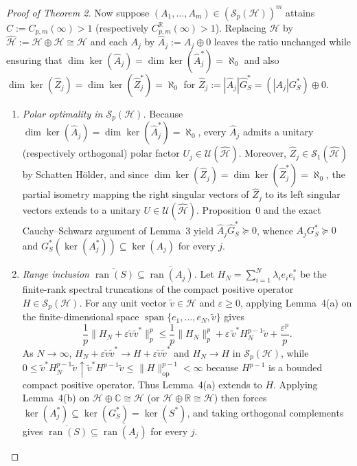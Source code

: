 \documentclass[10pt,letterpaper]{article}
\newcommand{\C}{\mathbb{C}}
\newcommand{\R}{\mathbb{R}}
\newcommand{\Hilb}{\mathcal{H}}
\newcommand{\Sp}{\mathcal{S}_p}
\newcommand{\ran}{\operatorname{ran}}
\newcommand{\op}{\mathrm{op}}
\begin{document}
\begin{proof}[Proof of Theorem 2]
Now suppose $(A_1,\dots,A_m) \in (\Sp(\Hilb))^m$ attains $C := C_{p,m}(\infty) > 1$ (respectively $C_{p,m}^{\R}(\infty) > 1$). Replacing $\Hilb$ by $\widehat{\Hilb} := \Hilb \oplus \Hilb \cong \Hilb$ and each $A_j$ by $\widehat{A}_j := A_j \oplus 0$ leaves the ratio unchanged while ensuring that $\dim\ker(\widehat{A}_j) = \dim\ker(\widehat{A}_j^*) = \aleph_0$ and also $\dim\ker(\widehat{Z}_j) = \dim\ker(\widehat{Z}_j^*) = \aleph_0$ for $\widehat{Z}_j := |\widehat{A}_j|\widehat{G}_S^* = (|A_j|G_S^*) \oplus 0$.
\begin{enumerate}[leftmargin=1.6em,itemsep=2.5pt]
  \item \emph{Polar optimality in $\Sp(\Hilb)$.} Because $\dim\ker(\widehat{A}_j) = \dim\ker(\widehat{A}_j^*) = \aleph_0$, every $\widehat{A}_j$ admits a unitary (respectively orthogonal) polar factor $U_j \in \mathcal{U}(\widehat{\Hilb})$. Moreover, $\widehat{Z}_j \in \mathcal{S}_1(\widehat{\Hilb})$ by Schatten H\"older, and since $\dim\ker(\widehat{Z}_j) = \dim\ker(\widehat{Z}_j^*) = \aleph_0$, the partial isometry mapping the right singular vectors of $\widehat{Z}_j$ to its left singular vectors extends to a unitary $U \in \mathcal{U}(\widehat{\Hilb})$. Proposition~0 and the exact Cauchy--Schwarz argument of Lemma~3 yield $\widehat{A}_j \widehat{G}_S^* \succeq 0$, whence $A_j G_S^* \succeq 0$ and $G_S^*(\ker(A_j^*)) \subseteq \ker(A_j)$ for every $j$.
  \item \emph{Range inclusion $\overline{\ran(S)} \subseteq \overline{\ran(A_j)}$.} Let $H_N = \sum_{i=1}^N \lambda_i e_i e_i^*$ be the finite-rank spectral truncations of the compact positive operator $H \in \Sp(\Hilb)$. For any unit vector $\tilde{v} \in \Hilb$ and $\varepsilon \ge 0$, applying Lemma~4(a) on the finite-dimensional space $\operatorname{span}\{e_1,\dots,e_N,\tilde{v}\}$ gives
  \[
    \frac{1}{p}\|H_N + \varepsilon\tilde{v}\tilde{v}^*\|_p^p \le \frac{1}{p}\|H_N\|_p^p + \varepsilon\,\tilde{v}^* H_N^{p-1}\tilde{v} + \frac{\varepsilon^p}{p}.
  \]
  As $N \to \infty$, $H_N + \varepsilon\tilde{v}\tilde{v}^* \to H + \varepsilon\tilde{v}\tilde{v}^*$ and $H_N \to H$ in $\Sp(\Hilb)$, while $0 \le \tilde{v}^* H_N^{p-1}\tilde{v} \uparrow \tilde{v}^* H^{p-1}\tilde{v} \le \|H\|_{\op}^{p-1} < \infty$ because $H^{p-1}$ is a bounded compact positive operator. Thus Lemma~4(a) extends to $H$. Applying Lemma~4(b) on $\Hilb \oplus \C \cong \Hilb$ (or $\Hilb \oplus \R \cong \Hilb$) then forces $\ker(A_j^*) \subseteq \ker(G_S^*) = \ker(S^*)$, and taking orthogonal complements gives $\overline{\ran(S)} \subseteq \overline{\ran(A_j)}$ for every $j$.

\end{enumerate}
\end{proof}
\end{document}
